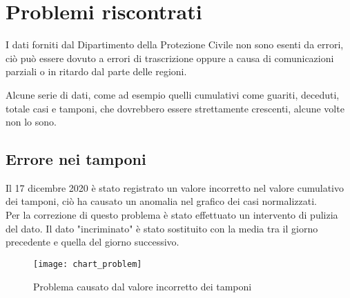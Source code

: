 \section{Problemi riscontrati}
I dati forniti dal Dipartimento della Protezione Civile non sono esenti da errori, ciò può essere dovuto a errori di trascrizione oppure a causa di comunicazioni parziali o in ritardo dal parte delle regioni.

\noindent Alcune serie di dati, come ad esempio quelli cumulativi come guariti, deceduti, totale casi e tamponi, che dovrebbero essere strettamente crescenti, alcune volte non lo sono.

\subsection{Errore nei tamponi}
Il 17 dicembre 2020 è stato registrato un valore incorretto nel valore cumulativo dei tamponi, ciò ha causato un anomalia nel grafico dei casi normalizzati.\\
Per la correzione di questo problema è stato effettuato un intervento di pulizia del dato.
Il dato "incriminato" è stato sostituito con la media tra il giorno precedente e quella del giorno successivo.
\begin{figure}[htp]
    \centering
    \texttt{[image: chart\_problem]}
    \caption{Problema causato dal valore incorretto dei tamponi}
\end{figure}


